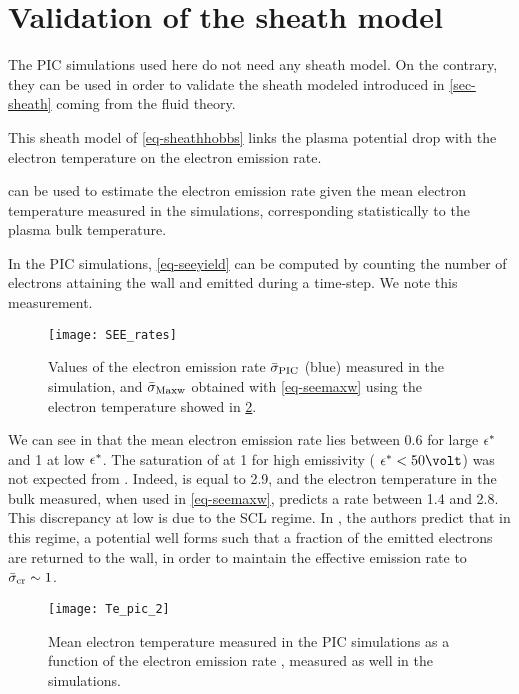 
\section{Validation of the sheath model }
  \label{sec-sheath_validation}
  
  The \ac{PIC} simulations used here do not need any sheath model.
  On the contrary, they can be used in order to validate the sheath modeled introduced in \vref{sec-sheath} coming from the fluid theory.
  
  This sheath model of \vref{eq-sheathhobbs} links the plasma potential drop with the electron temperature on the electron emission rate.

   can be used to estimate the electron emission rate given the mean electron temperature measured in the simulations, corresponding statistically to the plasma bulk temperature.   
  
  In the \ac{PIC} simulations, \cref{eq-seeyield} can be computed by counting the number of electrons attaining the wall and emitted during a time-step.
  We note \ratepic this measurement.
   
   
  \begin{figure}[hbtp]
    \centering
    \texttt{[image: SEE\_rates]}
    \caption{Values of the electron emission rate $ \bar{\sigma }_{\rm PIC}$ (blue) measured in the simulation, and $  \bar{\sigma }_{\rm Maxw}$ obtained with \cref{eq-seemaxw} using the electron temperature showed in \cref{fig-Tevsproba}. }
    \label{fig-seeparamesMaxw}
  \end{figure}
  
  
  We can see in  that the mean electron emission rate lies between 0.6 for large $\epsilon^{*}$ and 1 at low $\epsilon^{*}$.
  The saturation of \ratepic at 1 for high emissivity ( $\crover < 50 \volt$) was not expected from \ratemaxw.
  Indeed, \probamax is equal to 2.9, and the electron temperature in the bulk measured, when used in \cref{eq-seemaxw}, predicts a rate between 1.4 and 2.8.
  This discrepancy at low \crover is due to the \ac{SCL} regime.
  In \citet{hobbs1967}, the authors predict that in this regime, a potential well forms such that a fraction of the emitted electrons are returned to the wall, in order to maintain the effective emission rate to $ \bar{\sigma }_{\rm cr}\sim1$.
  
  \begin{figure}[hbtp]
    \centering
    \texttt{[image: Te\_pic\_2]}
    \caption{Mean electron temperature measured in the \ac{PIC} simulations as a function of the electron emission rate \rate, measured as well in the simulations.  }
    \label{fig-Tevsproba}
  \end{figure}
  
